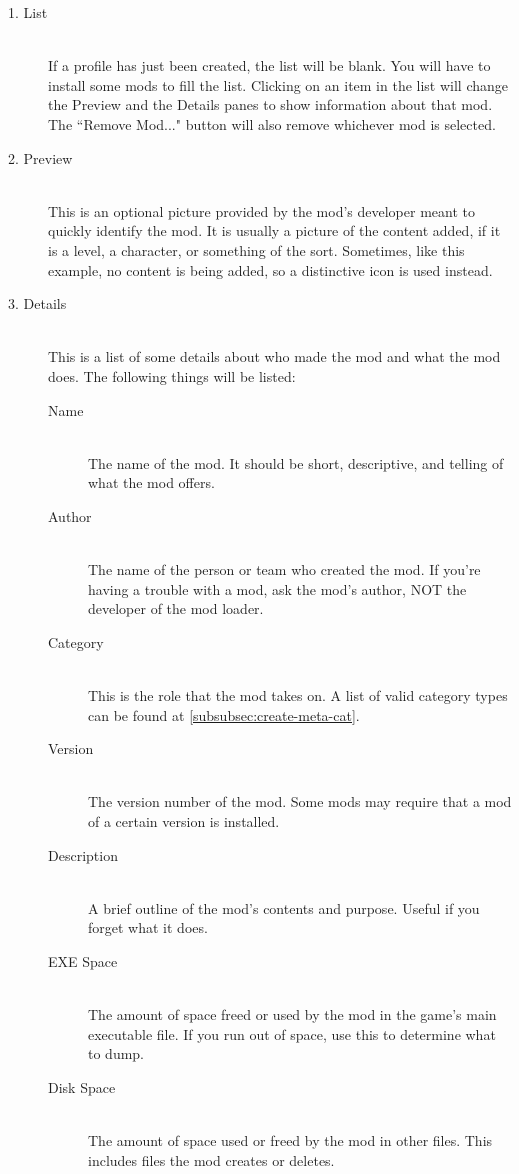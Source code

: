 \documentclass[12pt,a4paper,notitlepage]{article}
\begin{document}
\begin{description}
\item[1. List] \hfill \\
If a profile has just been created, the list will be blank. You will have to install some mods to fill the list. Clicking on an item in the list will change the Preview and the Details panes to show information about that mod. The ``Remove Mod..." button will also remove whichever mod is selected.

\item[2. Preview] \hfill \\
This is an optional picture provided by the mod's developer meant to quickly identify the mod. It is usually a picture of the content added, if it is a level, a character, or something of the sort. Sometimes, like this example, no content is being added, so a distinctive icon is used instead.

\item[3. Details] \hfill \\
This is a list of some details about who made the mod and what the mod does. The following things will be listed:

\begin{description}
\item[Name] \hfill \\ 
	 The name of the mod. It should be short, descriptive, and telling of what the mod offers. 
\item[Author] \hfill \\
	The name of the person or team who created the mod. If you're having a trouble with a mod, ask the mod's author, NOT the developer of the mod loader.
\item[Category] \hfill \\
	This is the role that the mod takes on. A list of valid category types can be found at \ref{subsubsec:create-meta-cat}.
\item[Version] \hfill \\
	The version number of the mod. Some mods may require that a mod of a certain version is installed.
\item[Description] \hfill \\
	A brief outline of the mod's contents and purpose. Useful if you forget what it does.
\item[EXE Space] \hfill \\
	The amount of space freed or used by the mod in the game's main executable file. If you run out of space, use this to determine what to dump.
\item[Disk Space] \hfill \\
	The amount of space used or freed by the mod in other files. This includes files the mod creates or deletes.
\end{description}
\end{description}
\end{document}
